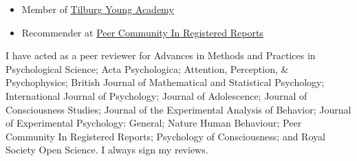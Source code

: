 \documentclass[12pt, a4paper]{article}
\begin{document}
\begin{itemize}
  \item Member of \href{https://www.tilburguniversity.edu/research/tilburg-young-academy/members}{Tilburg Young Academy}
  \item Recommender at \href{https://rr.peercommunityin.org/public/user_public_page?userId=1570}{Peer Community In Registered Reports}
\end{itemize}

I have acted as a peer reviewer for Advances in Methods and Practices in Psychological Science; Acta Psychologica; Attention, Perception, \& Psychophysics; British Journal of Mathematical and Statistical Psychology; International Journal of Psychology; Journal of Adolescence; Journal of Consciousness Studies; Journal of the Experimental Analysis of Behavior; Journal of Experimental Psychology: General; Nature Human Behaviour; Peer Community In Registered Reports; Psychology of Consciousness; and Royal Society Open Science. I always sign my reviews.

\vfill{}
\end{document}
